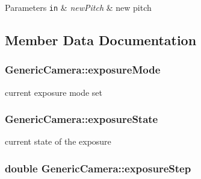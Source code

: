 \begin{DoxyParams}[1]{Parameters}
\mbox{\tt in}  & {\em new\+Pitch} & new pitch \\
\hline
\end{DoxyParams}


\subsection{Member Data Documentation}
\subsubsection[{\texorpdfstring{exposure\+Mode}{exposureMode}}]{ Generic\+Camera\+::exposure\+Mode\hspace{0.3cm}{\ttfamily [protected]}}\hypertarget{class_generic_camera_af73c8a9c6218780d50bda3a835d16770}{}\label{class_generic_camera_af73c8a9c6218780d50bda3a835d16770}


current exposure mode set 

\subsubsection[{\texorpdfstring{exposure\+State}{exposureState}}]{ Generic\+Camera\+::exposure\+State\hspace{0.3cm}{\ttfamily [protected]}}\hypertarget{class_generic_camera_a92600846c7691baabbc78af3b6e1cb67}{}\label{class_generic_camera_a92600846c7691baabbc78af3b6e1cb67}


current state of the exposure 

\subsubsection[{\texorpdfstring{exposure\+Step}{exposureStep}}]{\setlength{\rightskip}{0pt plus 5cm}double Generic\+Camera\+::exposure\+Step\hspace{0.3cm}{\ttfamily [protected]}}\hypertarget{class_generic_camera_a1d0a61c9839147adaa86e9c456e3ce0c}{}\label{class_generic_camera_a1d0a61c9839147adaa86e9c456e3ce0c}


